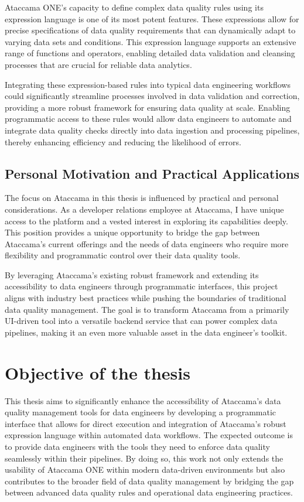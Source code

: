  Ataccama ONE's capacity to define complex data quality rules using its expression language is one of its most potent features. These expressions allow for precise specifications of data quality requirements that can dynamically adapt to varying data sets and conditions. This expression language supports an extensive range of functions and operators, enabling detailed data validation and cleansing processes that are crucial for reliable data analytics.
 
 Integrating these expression-based rules into typical data engineering workflows could significantly streamline processes involved in data validation and correction, providing a more robust framework for ensuring data quality at scale. Enabling programmatic access to these rules would allow data engineers to automate and integrate data quality checks directly into data ingestion and processing pipelines, thereby enhancing efficiency and reducing the likelihood of errors.
 
 \subsection*{Personal Motivation and Practical Applications}
 
 The focus on Ataccama in this thesis is influenced by practical and personal considerations. As a developer relations employee at Ataccama, I have unique access to the platform and a vested interest in exploring its capabilities deeply. This position provides a unique opportunity to bridge the gap between Ataccama's current offerings and the needs of data engineers who require more flexibility and programmatic control over their data quality tools.
 
 By leveraging Ataccama's existing robust framework and extending its accessibility to data engineers through programmatic interfaces, this project aligns with industry best practices while pushing the boundaries of traditional data quality management. The goal is to transform Ataccama from a primarily UI-driven tool into a versatile backend service that can power complex data pipelines, making it an even more valuable asset in the data engineer's toolkit.

 \section*{Objective of the thesis}

 This thesis aims to significantly enhance the accessibility of Ataccama's data quality management tools for data engineers by developing a programmatic interface that allows for direct execution and integration of Ataccama's robust expression language within automated data workflows. The expected outcome is to provide data engineers with the tools they need to enforce data quality seamlessly within their pipelines. By doing so, this work not only extends the usability of Ataccama ONE within modern data-driven environments but also contributes to the broader field of data quality management by bridging the gap between advanced data quality rules and operational data engineering practices.
